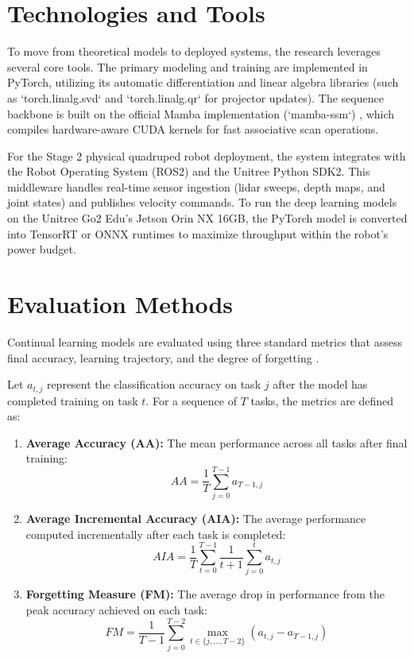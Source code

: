 \section{Technologies and Tools}
\label{sec:technologies}

To move from theoretical models to deployed systems, the research leverages several core tools. The primary modeling and training are implemented in PyTorch, utilizing its automatic differentiation and linear algebra libraries (such as `torch.linalg.svd` and `torch.linalg.qr` for projector updates). The sequence backbone is built on the official Mamba implementation (`mamba-ssm`) \cite{guMambaLinearTimeSequence2024}, which compiles hardware-aware CUDA kernels for fast associative scan operations.

For the Stage 2 physical quadruped robot deployment, the system integrates with the Robot Operating System (ROS2) and the Unitree Python SDK2. This middleware handles real-time sensor ingestion (lidar sweeps, depth maps, and joint states) and publishes velocity commands. To run the deep learning models on the Unitree Go2 Edu's Jetson Orin NX 16GB, the PyTorch model is converted into TensorRT or ONNX runtimes to maximize throughput within the robot's power budget.

\section{Evaluation Methods}
\label{sec:evaluation_methods}

Continual learning models are evaluated using three standard metrics that assess final accuracy, learning trajectory, and the degree of forgetting \cite{langeContinualLearningSurvey2021}.

Let $a_{t,j}$ represent the classification accuracy on task $j$ after the model has completed training on task $t$. For a sequence of $T$ tasks, the metrics are defined as:
\begin{enumerate}
    \item \textbf{Average Accuracy (AA):} The mean performance across all tasks after final training:
    \begin{equation}
        AA = \frac{1}{T} \sum_{j=0}^{T-1} a_{T-1,j}
        \label{eq:metric_aa}
    \end{equation}
    \item \textbf{Average Incremental Accuracy (AIA):} The average performance computed incrementally after each task is completed:
    \begin{equation}
        AIA = \frac{1}{T} \sum_{t=0}^{T-1} \frac{1}{t+1} \sum_{j=0}^{t} a_{t,j}
        \label{eq:metric_aia}
    \end{equation}
    \item \textbf{Forgetting Measure (FM):} The average drop in performance from the peak accuracy achieved on each task:
    \begin{equation}
        FM = \frac{1}{T-1} \sum_{j=0}^{T-2} \max_{t \in \{j,\dots,T-2\}} (a_{t,j} - a_{T-1,j})
        \label{eq:metric_fm}
    \end{equation}
\end{enumerate}

